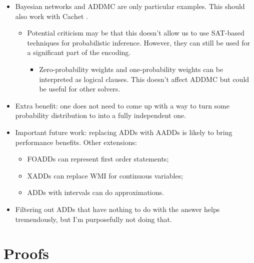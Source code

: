 \documentclass[letterpaper]{article} %
\theoremstyle{definition}
\theoremstyle{remark}
\begin{document}
{\begin{itemize}
\item Bayesian networks and ADDMC are only particular examples. This should also
  work with Cachet \cite{DBLP:conf/sat/SangBBKP04}.
  \begin{itemize}
  \item Potential criticism may be that this doesn't allow us to use SAT-based
    techniques for probabilistic inference. However, they can still be used for
    a significant part of the encoding.
    \begin{itemize}
    \item Zero-probability weights and one-probability weights can be
      interpreted as logical clauses. This doesn't affect ADDMC but could be
      useful for other solvers.
    \end{itemize}
  \end{itemize}
\item Extra benefit: one does not need to come up with a way to turn some
  probability distribution to into a fully independent one.
\item Important future work: replacing ADDs with
  AADDs \cite{DBLP:conf/ijcai/SannerM05} is likely to bring performance
  benefits.
  Other extensions:
  \begin{itemize}
  \item FOADDs can represent first order statements;
  \item XADDs can replace WMI for continuous variables;
  \item ADDs with intervals can do approximations.
  \end{itemize}
\item Filtering out ADDs that have nothing to do with the answer helps
  tremendously, but I'm purposefully not doing that.
\end{itemize}



\appendix
\section{Proofs}

}
\end{document}
